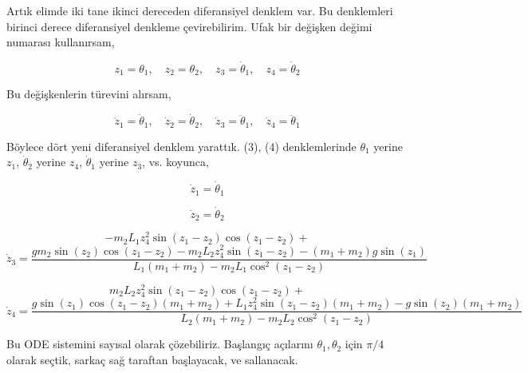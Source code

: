 \documentclass[12pt,fleqn]{article}\usepackage{../../common}
\begin{document}
Artık elimde iki tane ikinci dereceden diferansiyel denklem var. Bu
denklemleri birinci derece diferansiyel denkleme çevirebilirim. Ufak bir
değişken değimi numarası kullanırsam, 

$$
z_1 = \theta_1, \quad
z_2 = \theta_2, \quad
z_3 = \dot{\theta}_1, \quad
z_4 = \dot{\theta}_2
$$

Bu değişkenlerin türevini alırsam, 

$$
\dot{z}_1 = \dot{\theta}_1, \quad
\dot{z}_2 = \dot{\theta}_2, \quad
\dot{z}_3 = \ddot{\theta}_1, \quad
\dot{z}_4 = \ddot{\theta}_1
$$

Böylece dört yeni diferansiyel denklem yarattık. (3), (4) denklemlerinde
$\theta_1$ yerine $z_1$, $\dot{\theta}_2$ yerine $z_4$, $\dot{\theta}_1$
yerine $z_3$, vs. koyunca,

$$
\dot{z}_1 = \dot{\theta}_1
$$

$$
\dot{z}_2 = \dot{\theta}_2
$$

$$
 -m_2 L_1 z_4^2 \sin(z_1-z_2)\cos(z_1-z_2) + 
$$
$$
\dot{z}_3 = 
\frac{ g m_2 \sin(z_2)\cos(z_1-z_2) -
m_2 L_2 z_4^2 \sin(z_1-z_2) - (m_1+m_2)g\sin(z_1)
}
{L_1 (m_1+m_2)-m_2L_1\cos^2(z_1-z_2)}
$$

$$
m_2 L_2 z_4^2 \sin(z_1-z_2)\cos(z_1-z_2) + 
$$
$$
\dot{z}_4 = 
\frac{ 
g \sin(z_1) \cos(z_1-z_2)(m_1+m_2) + 
L_1 z_4^2 \sin(z_1-z_2)(m_1+m_2) - g\sin(z_2) (m_1+m_2)
}
{L_2 (m_1+m_2) - m_2 L_2 \cos^2 (z_1-z_2)}
$$

Bu ODE sistemini sayısal olarak çözebiliriz. Başlangıç açılarını
$\theta_1,\theta_2$ için $\pi/4$ olarak seçtik, sarkaç sağ taraftan
başlayacak, ve sallanacak. 
\end{document}
